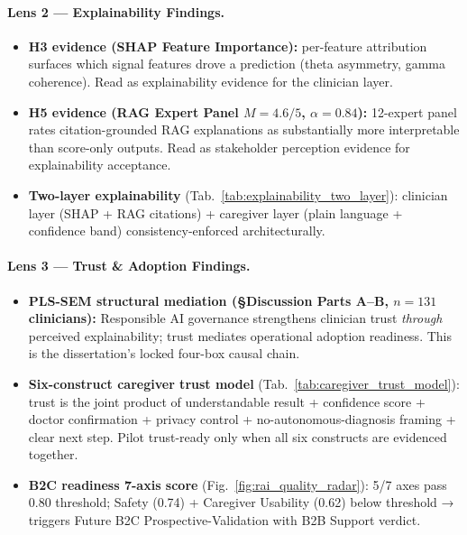 \paragraph{Lens 2 --- Explainability Findings.}
\label{para:lens_explainability}
\begin{itemize}[leftmargin=*, itemsep=3pt]
    \item \textbf{H3 evidence (SHAP Feature Importance):} per-feature attribution surfaces which signal features drove a prediction (theta asymmetry, gamma coherence). Read as explainability evidence for the clinician layer.
    \item \textbf{H5 evidence (RAG Expert Panel $M = 4.6/5$, $\alpha = 0.84$):} 12-expert panel rates citation-grounded RAG explanations as substantially more interpretable than score-only outputs. Read as stakeholder perception evidence for explainability acceptance.
    \item \textbf{Two-layer explainability} (Tab.~\ref{tab:explainability_two_layer}): clinician layer (SHAP + RAG citations) + caregiver layer (plain language + confidence band) consistency-enforced architecturally.
\end{itemize}

\paragraph{Lens 3 --- Trust \& Adoption Findings.}
\label{para:lens_trust_adoption}
\begin{itemize}[leftmargin=*, itemsep=3pt]
    \item \textbf{PLS-SEM structural mediation (§Discussion Parts A--B, $n = 131$ clinicians):} Responsible AI governance strengthens clinician trust \emph{through} perceived explainability; trust mediates operational adoption readiness. This is the dissertation's locked four-box causal chain.
    \item \textbf{Six-construct caregiver trust model} (Tab.~\ref{tab:caregiver_trust_model}): trust is the joint product of understandable result + confidence score + doctor confirmation + privacy control + no-autonomous-diagnosis framing + clear next step. Pilot trust-ready only when all six constructs are evidenced together.
    \item \textbf{B2C readiness 7-axis score} (Fig.~\ref{fig:rai_quality_radar}): 5/7 axes pass 0.80 threshold; Safety (0.74) + Caregiver Usability (0.62) below threshold → triggers Future B2C Prospective-Validation with B2B Support verdict.
\end{itemize}

